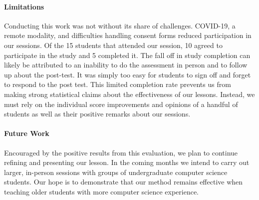 

\paragraph{Limitations}

Conducting this work was not without its share of challenges.
COVID-19, a remote modality, and difficulties handling consent forms
reduced participation in our sessions.
Of the 15 students that attended our session, 10 agreed to participate in
the study and 5 completed it.
The fall off in study completion can likely be attributed to
an inability to
do the assessment in person and to
follow up about the post-test.
It was simply too easy for students to sign off and forget
to respond to the post test.
This limited completion rate prevents us from making strong
statistical claims about the effectiveness of our lessons.
Instead, we must rely on the individual score improvements and opinions
of a handful of students as well as their positive remarks about
our sessions.



\paragraph{Future Work}
Encouraged by the positive results from this evaluation,
we plan to continue refining and presenting our lesson.
In the coming months we intend to carry out larger, in-person sessions
with groups of undergraduate computer science students.
Our hope is to demonstrate that our method remains effective
when teaching older students with more computer science experience.
